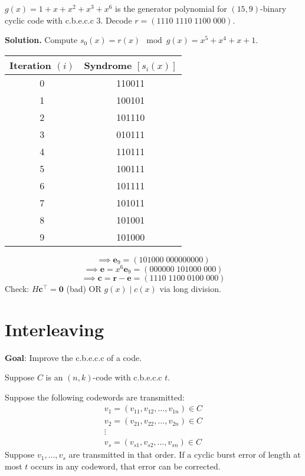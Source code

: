 \begin{exbox}
    \begin{example}
        $ g(x)=1+x+x^2+x^3+x^6 $ is the generator polynomial for $ (15,9) $-binary
        cyclic code with c.b.e.c.c $ 3 $. Decode $ r=(1110\; 1110\; 1100\; 000) $.

        \textbf{Solution.}
        Compute $ s_0(x)=r(x)\mod g(x)=x^5+x^4+x+1 $.
        \begin{table}[H]
            \centering
            \begin{tabular}{@{}cc@{}}
                Iteration $ (i) $ & Syndrome $ [s_i(x)] $ \\
                \midrule
                0                 & 110011                \\
                1                 & 100101                \\
                2                 & 101110                \\
                3                 & 010111                \\
                4                 & 110111                \\
                5                 & 100111                \\
                6                 & 101111                \\
                7                 & 101011                \\
                8                 & 101001                \\
                9                 & 101000
            \end{tabular}
        \end{table}
        \[ \implies \bm{e}_9=(101000\; 000000000) \]
        \[ \implies \bm{e}=x^6 \bm{e}_9=(000000\; 101000\;000 ) \]
        \[ \implies \bm{c}=\bm{r}-\bm{e}=(1110\;1100\;0100\;000) \]
        Check: $ H\bm{c}^\top=\bm{0} $ (bad) OR $ g(x)\mid c(x) $ via long division.
    \end{example}
\end{exbox}

\section{Interleaving}
\textbf{Goal}: Improve the c.b.e.c.c of a code.

Suppose $ C $ is an $ (n,k) $-code with c.b.e.c.c $ t $.

Suppose the following codewords are transmitted:
\[ \begin{array}{c}
        v_1=(v_{11},v_{12},\ldots ,v_{1n})\in C \\
        v_2=(v_{21},v_{22},\ldots ,v_{2n})\in C \\
        \vdots                                  \\
        v_s=(v_{s1},v_{s2},\ldots ,v_{s n})\in C
    \end{array} \]
Suppose $ v_1,\ldots ,v_s $ are transmitted in that order. If a cyclic burst error
of length at most $ t $ occurs in any codeword, that error can be corrected.

